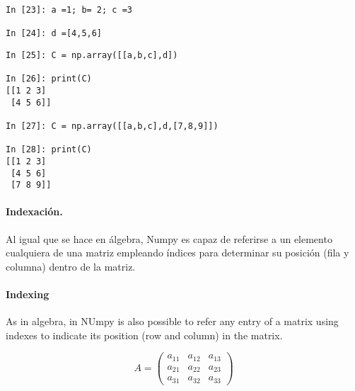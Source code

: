 \begin{center}
    \begin{minipage}{0.4\textwidth}
        \begin{verbatim}
In [23]: a =1; b= 2; c =3

In [24]: d =[4,5,6]

        \end{verbatim}
\end{minipage}
\end{center}
\begin{center}
\begin{minipage}{0.4\textwidth}
\begin{verbatim}
In [25]: C = np.array([[a,b,c],d])

In [26]: print(C)
[[1 2 3]
 [4 5 6]]

In [27]: C = np.array([[a,b,c],d,[7,8,9]])

In [28]: print(C)
[[1 2 3]
 [4 5 6]
 [7 8 9]]
        \end{verbatim}
    \end{minipage}
\end{center}
\begin{paracol}{2}
\paragraph*{Indexación.} Al igual que se hace en álgebra, Numpy es capaz de referirse a un elemento cualquiera de una matriz empleando índices para determinar su posición (fila y columna) dentro de la matriz.
\switchcolumn
\paragraph{Indexing} As in algebra, in NUmpy is also possible to refer any entry of a matrix using indexes to indicate its position (row and column) in the matrix. 
\end{paracol}
\begin{equation*}
A=
\begin{pmatrix}
a_{11}&a_{12}&a_{13}\\
a_{21}&a_{22}&a_{23}\\
a_{31}&a_{32}&a_{33}
\end{pmatrix}
\end{equation*}


